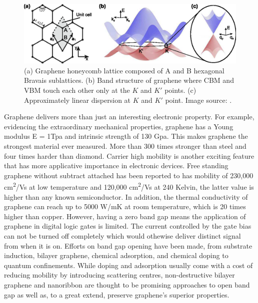 \begin{figure}[htbp!] 
\centering  
\includegraphics[width=\textwidth]{gra_lat_band.eps}
\caption[Graphene lattice and band structure.]{(a) Graphene honeycomb lattice composed of A and B hexagonal Bravais sublattices. (b) Band structure of graphene where CBM and VBM touch each other only at the $K$ and $K'$ points. (c) Approximately linear dispersion at $K$ and $K'$ point. Image source: \cite{Guttinger2012}. }  
\label{fig:gra_band}
\end{figure} 

Graphene delivers more than just an interesting electronic property. For example, evidencing the extraordinary mechanical properties, graphene has a Young modulus E = 1Tpa and intrinsic strength of 130 Gpa\cite{Lee385}. This makes graphene the strongest material ever measured. More than 300 times stronger than steel and four times harder than diamond. Carrier high mobility is another exciting feature that has more applicative importance in electronic devices. Free standing graphene without subtract attached has been reported to has mobility of 230,000 \si{cm^2/Vs} at low temperature\cite{Bolotin2008a} and 120,000 \si{cm^2/Vs} at 240 Kelvin, the latter value is higher than any known semiconductor\cite{Bolotin2008b}. In addition, the thermal conductivity of graphene can reach up to 5000 \si{W/mK} at room temperature, which is 20 times higher than copper\cite{balandin2008}. However, having a zero band gap means the application of graphene in digital logic gates is limited. The current controlled by the gate bias can not be turned off completely which would othewise deliver distinct signal from when it is on. Efforts on band gap opening have been made, from substrate induction\cite{Ci2010,zhou2007}, bilayer graphene\cite{mccann2006,castro2007}, chemical adsorption\cite{Elias2009,Jeon2011}, and chemical doping\cite{zhou2008} to quantum confinements\cite{Nakada1996,Barone2006}.  While doping and adsorption usually come with a cost of reducing mobility by introducing scattering centres, non-destructive bilayer graphene and nanoribbon are thought to be promising approaches to open band gap as well as, to a great extend, preserve graphene's superior properties.
















